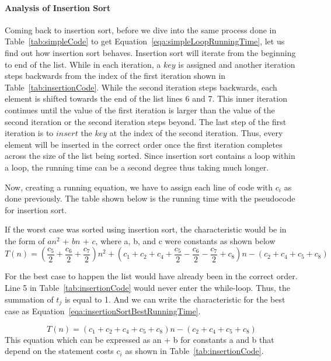\documentclass[12pt]{article}
\begin{document}
	\paragraph{Analysis of Insertion Sort}
	Coming back to insertion sort, before we dive into the same process done in Table~\ref{tab:simpleCode} to get Equation~\ref{eqa:simpleLoopRunningTime}, let us find out how insertion sort behaves.
	Insertion sort will iterate from the beginning to end of the list.
	While in each iteration, a $key$ is assigned and another iteration steps backwards from the index of the first iteration shown in Table~\ref{tab:insertionCode}.
	While the second iteration steps backwards, each element is shifted towards the end of the list lines 6 and 7.
	This inner iteration continues until the value of the first iteration is larger than the value of the second iteration or the second iteration steps beyond.
	The last step of the first iteration is to $\textit{insert}$ the $key$ at the index of the second iteration.
	Thus, every element will be inserted in the correct order once the first iteration completes across the size of the list being sorted.
	Since insertion sort contains a loop within a loop, the running time can be a second degree thus taking much longer.
	
	Now, creating a running equation, we have to assign each line of code with $c_i$ as done previously.
	The table shown below is the running time with the pseudocode for insertion sort.
	
	
	
	If the worst case was sorted using insertion sort, the characteristic would be in the form of $an^2$ + $bn$ + $c$, where a, b, and c were constants as shown below
	\begin{equation}
	T(n) = (\frac{c_5}{2} + \frac{c_6}{2} + \frac{c_7}{2})n^2 + (c_1 + c_2 + c_4 + \frac{c_5}{2} - \frac{c_6}{2} - \frac{c_7}{2} + c_8)n - (c_2 + c_4 + c_5 + c_8)
	\label{eqa:insertionSortWorstRunningTime}
	\end{equation}
	
	For the best case to happen the list would have already been in the correct order.
	Line 5 in Table~\ref{tab:insertionCode} would never enter the while-loop.
	Thus, the summation of $t_j$ is equal to 1.
	And we can write the characteristic for the best case as Equation~\ref{eqa:insertionSortBestRunningTime}.
	
	\begin{equation}
	T(n) = (c_1 + c_2 + c_4 + c_5 + c_8)n - (c_2 + c_4 + c_5 + c_8)
	\label{eqa:insertionSortBestRunningTime}
	\end{equation}
	This equation which can be expressed as an + b for constants a and b that depend on the statement costs $c_i$ as shown in Table~\ref{tab:insertionCode}.
	
\end{document}
